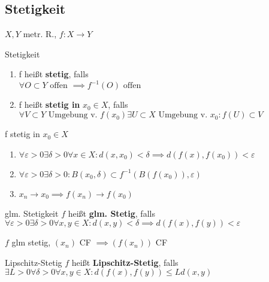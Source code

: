 \subsection{Stetigkeit}

$X,Y$ metr. R., $f:X\to Y$\\
\begin{definition}{Stetigkeit}
  \begin{enumerate}[label = (\arabic*)]
    \item  f heißt \textbf{stetig}, falls\\
      $\forall O \subset Y \text{ offen } \implies f^{-1}(O) \text{ offen }$
    \item f heißt \textbf{stetig in} $x_0 \in X$, falls\\
      $\forall V \subset Y \text{ Umgebung v. } f(x_0) \exists
      U \subset X \text{ Umgebung v. } x_0: f(U) \subset V$
  \end{enumerate}
\end{definition}

\begin{bemerkung}
  f stetig in $x_0 \in X$
  \begin{enumerate}[label= $\Leftrightarrow$]
    \item $\forall \varepsilon >0 \exists \delta >0 \forall x \in X:
      d(x,x_0)<\delta \implies d(f(x),f(x_0)) < \varepsilon$
    \item $\forall \varepsilon >0 \exists \delta >0:
      B(x_0,\delta) \subset f^{-1}(B(f(x_0)), \varepsilon)$
    \item $x_n \to x_0 \implies f(x_n) \to f(x_0)$
  \end{enumerate}
\end{bemerkung}

\begin{definition}{glm. Stetigkeit}
  $f$ heißt \textbf{glm. Stetig}, falls
  $\forall \varepsilon >0 \exists \delta >0 \forall x,y \in X:
  d(x,y) < \delta \implies d(f(x),f(y)) < \varepsilon$
\end{definition}

\begin{bemerkung}
    $f$ glm stetig, $(x_n)$ CF $\implies (f(x_n))$ CF
\end{bemerkung}

\begin{definition}{Lipschitz-Stetig}
  $f$ heißt \textbf{Lipschitz-Stetig}, falls
  $\exists L >0 \forall \delta >0 \forall x,y \in X:
  d(f(x),f(y)) \leq L d(x,y)$
\end{definition}

